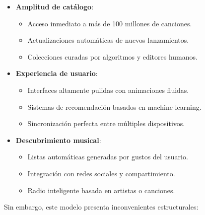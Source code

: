 \documentclass[11pt, a4paper]{article}
\begin{document}
\begin{itemize}
    \item \textbf{Amplitud de catálogo}:
    \begin{itemize}
        \item Acceso inmediato a más de 100 millones de canciones.
        \item Actualizaciones automáticas de nuevos lanzamientos.
        \item Colecciones curadas por algoritmos y editores humanos.
    \end{itemize}
    
    \item \textbf{Experiencia de usuario}:
    \begin{itemize}
        \item Interfaces altamente pulidas con animaciones fluidas.
        \item Sistemas de recomendación basados en machine learning.
        \item Sincronización perfecta entre múltiples dispositivos.
    \end{itemize}
    
    \item \textbf{Descubrimiento musical}:
    \begin{itemize}
        \item Listas automáticas generadas por gustos del usuario.
        \item Integración con redes sociales y compartimiento.
        \item Radio inteligente basada en artistas o canciones.
    \end{itemize}
\end{itemize}

Sin embargo, este modelo presenta inconvenientes estructurales:
\end{document}
